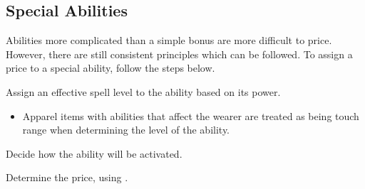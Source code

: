 \subsection{Special Abilities}

Abilities more complicated than a simple bonus are more difficult to price. However, there are still consistent principles which can be followed. To assign a price to a special ability, follow the steps below.
\begin{enumerate*}
    \item Assign an effective spell level to the ability based on its power.
        \begin{itemize}
            \item Apparel items with abilities that affect the wearer are treated as being touch range when determining the level of the ability.
        \end{itemize}
    \item Decide how the ability will be activated.
    \item Determine the price, using .
\end{enumerate*}

